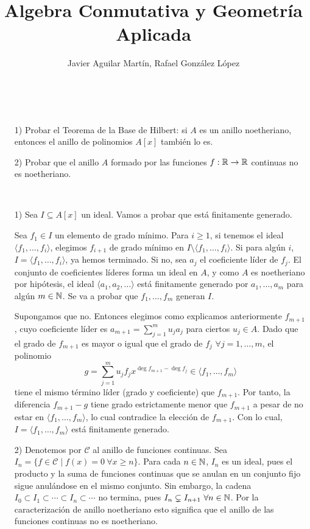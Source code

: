\documentclass[twoside]{article}
\begin{document}
\title{Algebra Conmutativa y Geometría Aplicada}
\author{Javier Aguilar Martín, Rafael González López}
\maketitle

\begin{ejercicio}{1}\
\begin{itemize}

\item[1)] Probar el Teorema de la Base de Hilbert: si $A$ es un anillo
noetheriano, entonces el anillo de polinomios $A[x]$ también lo es.

\item[2)] Probar que el anillo $A$ formado por las funciones $f : \mathbb{R} \to \mathbb{R}$ continuas
no es noetheriano.
\end{itemize}
\end{ejercicio}
\begin{solucion}\
\begin{itemize}


\item[1)]Sea $I\subseteq A[x]$ un ideal. Vamos a probar que está finitamente generado. 

Sea $f_1\in I$ un elemento de grado mínimo. Para $i\geq 1$, si tenemos el ideal $\langle f_1,\dots, f_i\rangle$, elegimos $f_{i+1}$ de grado mínimo en $I\setminus\langle f_1,\dots, f_i\rangle$. Si para algún $i$, $I=\langle f_1,\dots, f_i\rangle$, ya hemos terminado. Si no, sea $a_j$ el coeficiente líder de $f_j$. El conjunto de coeficientes líderes forma un ideal en $A$, y como $A$ es noetheriano por hipótesis, el ideal $\langle a_1,a_2,\dots\rangle$ está finitamente generado por $a_1,\dots,a_m$ para algún $m\in\mathbb{N}$. Se va a probar que $f_1,\dots,f_m$ generan $I$.

Supongamos que no. Entonces elegimos como explicamos anteriormente $f_{m+1}$, cuyo coeficiente líder es $a_{m+1}=\sum_{j=1}^m u_j a_j$ para ciertos $u_j\in A$. Dado que el grado de $f_{m+1}$ es mayor o igual que el grado de $f_j$ $\forall j=1,\dots, m$, el polinomio
$$g=\sum_{j=1}^m u_j f_j x^{\deg{f_{m+1}}-\deg{f_j}}\in\langle f_1,\dots,f_m\rangle$$
tiene el mismo término líder (grado y coeficiente) que $f_{m+1}$. Por tanto, la diferencia $f_{m+1}-g$ tiene grado estrictamente menor que $f_{m+1}$ a pesar de no estar en $\langle f_1,\dots,f_m\rangle$, lo cual contradice la elección de $f_{m+1}$. Con lo cual, $I=\langle f_1,\dots,f_m\rangle$ está finitamente generado.

\item[2)] Denotemos por $\mathcal{C}$ al anillo de funciones continuas. Sea $I_n=\{f\in\mathcal{C}\mid f(x)=0\ \forall x\geq n\}$. Para cada $n\in\mathbb{N}$, $I_n$ es un ideal, pues el producto y la suma de funciones continuas que se anulan en un conjunto fijo sigue anulándose en el mismo conjunto. Sin embargo, la cadena $I_0\subset I_1\subset\cdots\subset I_n\subset\cdots$ no termina, pues $I_{n}\subsetneq I_{n+1}\ \forall n\in\N$. Por la caracterización de anillo noetheriano esto significa que el anillo de las funciones continuas no es noetheriano. 
\end{itemize}
\end{solucion}
\end{document}
